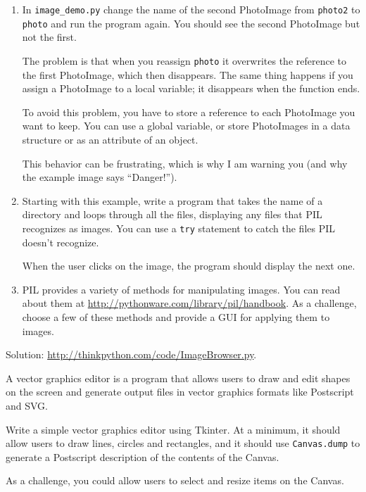 \documentclass[10pt]{book}
\begin{document}
\begin{exercise}
\begin{enumerate}
\item In \verb"image_demo.py" change the name of the second
PhotoImage from {\tt photo2} to {\tt photo} and run the program
again.  You should see the second PhotoImage but not the first.

The problem is that when you reassign {\tt photo} it overwrites
the reference to the first PhotoImage, which then disappears.  The
same thing happens if you assign a PhotoImage to a local
variable; it disappears when the function ends.

To avoid this problem, you have to store a reference to each
PhotoImage you want to keep.  You can use a global variable, or
store PhotoImages in a data structure or as an attribute of
an object.

This behavior can be frustrating, which is why I am warning
you (and why the example image says ``Danger!'').

\item Starting with this example, write a program that takes
the name of a directory and loops through all the files, displaying
any files that PIL recognizes as images.  You can use a {\tt try}
statement to catch the files PIL doesn't recognize.

When the user clicks on the image, the program should display the next one.

\item PIL provides a variety of methods for manipulating images.
You can read about them at \url{http://pythonware.com/library/pil/handbook}.
As a challenge, choose a few of these methods and provide a
GUI for applying them to images.

\end{enumerate}

Solution: \url{http://thinkpython.com/code/ImageBrowser.py}.

\end{exercise}


\begin{exercise}

A vector graphics editor is a program that allows users to draw and
edit shapes on the screen and generate output files in vector graphics
formats like Postscript and SVG.

Write a simple vector graphics editor using Tkinter.  At a
minimum, it should allow users to draw lines, circles and
rectangles, and it should use {\tt Canvas.dump} to
generate a Postscript description of the contents of the
Canvas.

As a challenge, you could allow users to select and resize
items on the Canvas.


\end{exercise}
\end{document}
